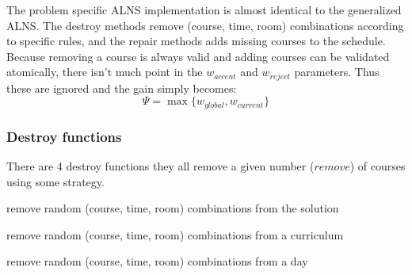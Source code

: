 The problem specific ALNS implementation is almost identical to the generalized ALNS. The destroy methods remove (course, time, room) combinations according to specific rules, and the repair methods adds missing courses to the schedule. Because removing a course is always valid and adding courses can be validated atomically, there isn't much point in the $w_{accent}$ and $w_{reject}$ parameters. Thus these are ignored and the gain simply becomes:
\begin{equation}
\Psi = \max\{w_{global}, w_{current}\}
\end{equation}

\subsubsection{Destroy functions}

There are 4 destroy functions they all remove a given number ($remove$) of courses using some strategy.

\begin{algorithm}[H]
  \caption{remove random (course, time, room) combinations from the solution}
  \begin{algorithmic}[1]
        \State {}
      \EndFor
    \EndFunction
  \end{algorithmic}
\end{algorithm}

\begin{algorithm}[H]
  \caption{remove random (course, time, room) combinations from a curriculum}
  \begin{algorithmic}[1]
        \State {}
      \EndFor
    \EndFunction
  \end{algorithmic}
\end{algorithm}

\begin{algorithm}[H]
  \caption{remove random (course, time, room) combinations from a day}
  \begin{algorithmic}[1]
        \State {}
      \EndFor
    \EndFunction
  \end{algorithmic}
\end{algorithm}

